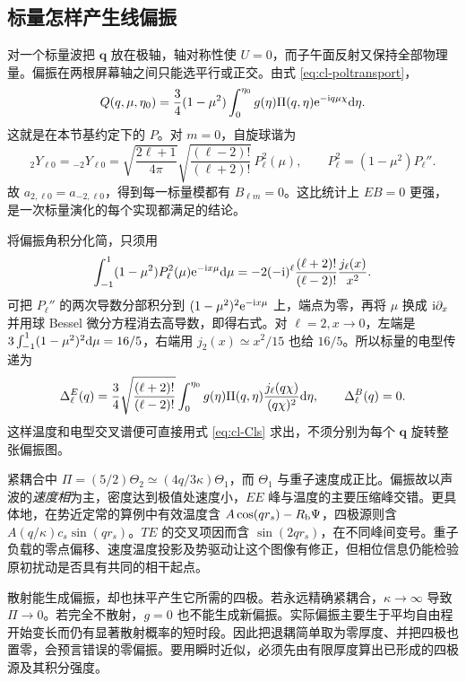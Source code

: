 \subsection{标量怎样产生线偏振}

对一个标量波把 $\bm q$ 放在极轴，轴对称性使 $U=0$，而子午面反射又保持全部物理量。偏振在两根屏幕轴之间只能选平行或正交。由式 \eqref{eq:cl-poltransport}，
\[
 Q(q,\mu,\eta_0)=\frac34(1-\mu^2)
                 \int_0^{\eta_0}g(\eta)\Pi(q,\eta)
                       \mathrm{e}^{-\mathrm{i} q\mu\chi}\dd\eta .
\]
这就是在本节基约定下的 $P$。对 $m=0$，自旋球谐为
\[
 {}_2Y_{\ell0}={}_{-2}Y_{\ell0}
 =\sqrt{\frac{2\ell+1}{4\pi}}\sqrt{\frac{(\ell-2)!}{(\ell+2)!}}\,
                 P_\ell^2(\mu),
 \qquad P_\ell^2=(1-\mu^2)P_\ell'' .
\]
故 $a_{2,\ell0}=a_{-2,\ell0}$，得到每一标量模都有 $B_{\ell m}=0$。这比统计上 $EB=0$ 更强，是一次标量演化的每个实现都满足的结论。

将偏振角积分化简，只须用
\[
 \int_{-1}^1(1-\mu^2)P_\ell^2(\mu)\mathrm{e}^{-\mathrm{i} x\mu}\dd\mu
  =-2(-\mathrm{i})^\ell\frac{(\ell+2)!}{(\ell-2)!}\frac{j_\ell(x)}{x^2}.
\]
可把 $P_\ell''$ 的两次导数分部积分到 $(1-\mu^2)^2\mathrm{e}^{-\mathrm{i} x\mu}$ 上，端点为零，再将 $\mu$ 换成 $\mathrm{i}\partial_x$ 并用球 Bessel 微分方程消去高导数，即得右式。对 $\ell=2,x\to0$，左端是 $3\int_{-1}^1(1-\mu^2)^2\dd\mu=16/5$，右端用 $j_2(x)\simeq x^2/15$ 也给 $16/5$。所以标量的电型传递为
\begin{equation}\label{eq:cl-losE}
 \Delta_\ell^E(q)=\frac34\sqrt{\frac{(\ell+2)!}{(\ell-2)!}}
             \int_0^{\eta_0}g(\eta)\Pi(q,\eta)
                         \frac{j_\ell(q\chi)}{(q\chi)^2}\dd\eta,\qquad
 \Delta_\ell^B(q)=0 .
\end{equation}
这样温度和电型交叉谱便可直接用式 \eqref{eq:cl-Cls} 求出，不须分别为每个 $\bm q$ 旋转整张偏振图。

紧耦合中 $\Pi=(5/2)\Theta_2\simeq(4q/3\kappa)\Theta_1$，而 $\Theta_1$ 与重子速度成正比。偏振故以声波的\emph{速度相}为主，密度达到极值处速度小，$EE$ 峰与温度的主要压缩峰交错。更具体地，在势近定常的算例中有效温度含 $A\cos(qr_s)-R_{\rm b}\Psi$，四极源则含 $A(q/\kappa)c_s\sin(qr_s)$。$TE$ 的交叉项因而含 $\sin(2qr_s)$，在不同峰间变号。重子负载的零点偏移、速度温度投影及势驱动让这个图像有修正，但相位信息仍能检验原初扰动是否具有共同的相干起点。

散射能生成偏振，却也抹平产生它所需的四极。若永远精确紧耦合，$\kappa\to\infty$ 导致 $\Pi\to0$。若完全不散射，$g=0$ 也不能生成新偏振。实际偏振主要生于平均自由程开始变长而仍有显著散射概率的短时段。因此把退耦简单取为零厚度、并把四极也置零，会预言错误的零偏振。要用瞬时近似，必须先由有限厚度算出已形成的四极源及其积分强度。

